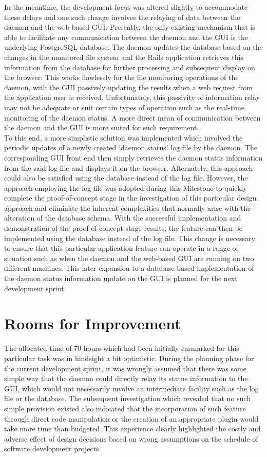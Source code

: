 In the meantime, the development focus was altered slightly to accommodate these delays and one such change involves the relaying of data between the daemon and the web-based GUI. Presently, the only existing mechanism that is able to facilitate any communication between the daemon and the GUI is the underlying PostgreSQL database. The daemon updates the database based on the changes in the monitored file system and the Rails application retrieves this information from the database for further processing and subsequent display on the browser. This works flawlessly for the file monitoring operations of the daemon, with the GUI passively updating the results when a web request from the application user is received. Unfortunately, this passivity of information relay may not be adequate or suit certain types of operation such as the real-time monitoring of the daemon status. A more direct mean of communication between the daemon and the GUI is more suited for such requirement. \\

To this end, a more simplistic solution was implemented which involved the periodic updates of a newly created `daemon status' log file by the daemon. The corresponding GUI front end then simply retrieves the daemon status information from the said log file and displays it on the browser. Alternately, this approach could also be satisfied using the database instead of the log file. However, the approach employing the log file was adopted during this Milestone to quickly complete the proof-of-concept stage in the investigation of this particular design approach and eliminate the inherent complexities that normally arise with the alteration of the database schema. With the successful implementation and demonstration of the proof-of-concept stage results, the feature can then be implemented using the database instead of the log file. This change is necessary to ensure that this particular application feature can operate in a range of situation such as when the daemon and the web-based GUI are running on two different machines. This later expansion to a database-based implementation of the daemon status information update on the GUI is planned for the next development sprint.


\section*{Rooms for Improvement}

The allocated time of 70 hours which had been initially earmarked for this particular task was in hindsight a bit optimistic. During the planning phase for the current development sprint, it was wrongly assumed that there was some simple way that the daemon could directly relay its status information to the GUI, which would not necessarily involve an intermediate facility such as the log file or the database. The subsequent investigation which revealed that no such simple provision existed also indicated that the incorporation of such feature through direct code manipulation or the creation of an appropriate plugin would take more time than budgeted. This experience clearly highlighted the costly and adverse effect of design decisions based on wrong assumptions on the schedule of software development projects.
